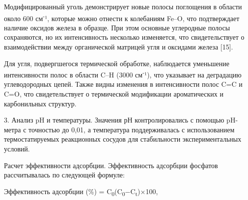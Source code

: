 \begin{multicols}{2}
Модифицированный уголь демонстрирует новые полосы поглощения в области
около 600 см\textsuperscript{-}¹, которые можно отнести к колебаниям
Fe--O, что подтверждает наличие оксидов железа в образце. При этом
основные углеродные полосы сохраняются, но их интенсивность несколько
изменяется, что свидетельствует о взаимодействии между органической
матрицей угля и оксидами железа {[}15{]}.

Для угля, подвергшегося термической обработке, наблюдается уменьшение
интенсивности полос в области C--H (3000 см\textsuperscript{-}¹), что
указывает на деградацию углеводородных цепей. Также видны изменения в
интенсивности полос C=C и C=O, что свидетельствует о термической
модификации ароматических и карбонильных структур.

3. Анализ pH и температуры. Значения рН контролировались с помощью
pH-метра с точностью до 0,01, а температура поддерживалась с
использованием термостатируемых реакционных сосудов для стабильности
экспериментальных условий.

Расчет эффективности адсорбции. Эффективность адсорбции фосфатов
рассчитывалась по следующей формуле:
\end{multicols}

\begin{center}
Эффективность адсорбции (\%) = C\textsubscript{0}(C\textsubscript{0}−C\textsubscript{t})×100,
\end{center}

